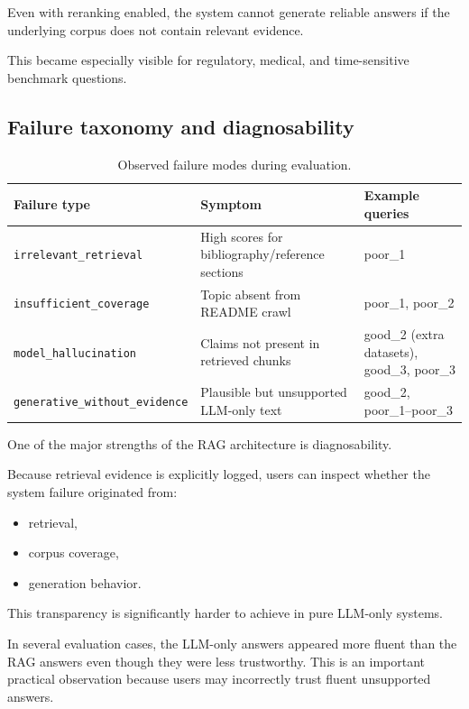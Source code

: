 \documentclass[11pt,a4paper]{article}
\begin{document}
Even with reranking enabled, the system cannot generate reliable answers if the underlying corpus does not contain relevant evidence.

This became especially visible for regulatory, medical, and time-sensitive benchmark questions.

\subsection{Failure taxonomy and diagnosability}

\begin{table}[ht]
\centering
\small
\begin{tabular}{p{3.2cm}p{7.2cm}p{4.8cm}}
\toprule
Failure type & Symptom & Example queries \\
\midrule
\texttt{irrelevant\_retrieval} & High scores for bibliography/reference sections & poor\_1 \\
\texttt{insufficient\_coverage} & Topic absent from README crawl & poor\_1, poor\_2 \\
\texttt{model\_hallucination} & Claims not present in retrieved chunks & good\_2 (extra datasets), good\_3, poor\_3 \\
\texttt{generative\_without\_evidence} & Plausible but unsupported LLM-only text & good\_2, poor\_1--poor\_3 \\
\bottomrule
\end{tabular}
\caption{Observed failure modes during evaluation.}
\label{tab:failures}
\end{table}

One of the major strengths of the RAG architecture is diagnosability.

Because retrieval evidence is explicitly logged, users can inspect whether the system failure originated from:

\begin{itemize}
  \item retrieval,
  \item corpus coverage,
  \item generation behavior.
\end{itemize}

This transparency is significantly harder to achieve in pure LLM-only systems.

In several evaluation cases, the LLM-only answers appeared more fluent than the RAG answers even though they were less trustworthy. This is an important practical observation because users may incorrectly trust fluent unsupported answers.
\end{document}
